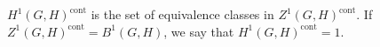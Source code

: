 $H^1(G, H)^{\text{cont}}$ is the set of equivalence classes in $Z^1(G, H)^{\text{cont}}$. If $Z^1(G, H)^{\text{cont}} = B^1(G, H)$, we say that $H^1(G, H)^{\text{cont}} = 1$.
